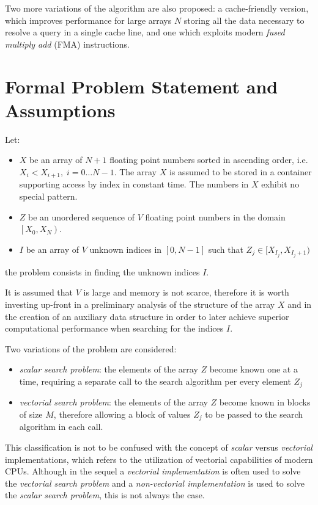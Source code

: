 \documentclass[preprint,1p,times]{elsarticle}
\begin{document}
Two more variations of the algorithm are also proposed: a cache-friendly version, which improves performance for large arrays $N$ storing all the data necessary to resolve a query in a single cache line, and one which exploits modern \textit{fused multiply add} (FMA) instructions.

\section{Formal Problem Statement and Assumptions}
\label{sec:definition}
\noindent Let: 
\begin{itemize}
	\item $X$ be an array of $N+1$ floating point numbers sorted in ascending order, i.e. $X_{i}<X_{i+1}, \; i=0 \dots N-1$.
	The array $X$ is assumed to be stored in a container supporting access by index in constant time. The numbers in $X$ exhibit no special pattern.
	\item $Z$ be an unordered sequence of $V$ floating point numbers in the domain $\left[X_0, X_N \right)$.
\item $I$ be an array of $V$ unknown indices in $[0,N-1]$ such that $Z_j \in [X_{I_j}, X_{I_j+1})$
\end{itemize}
the problem consists in finding the unknown indices $I$.

It is assumed that $V$ is large and memory is not scarce, therefore it is worth investing up-front in a preliminary analysis of the structure of the array $X$ and in the creation of an auxiliary data structure in order to later achieve superior computational performance when searching for the indices $I$.

Two variations of the problem are considered:
\begin{itemize}
\item \textit{scalar search problem}: the elements of the array $Z$ become known one at a time, requiring a separate call to the search algorithm per every element $Z_j$
\item \textit{vectorial search problem}: the elements of the array $Z$ become known in blocks of size $M$, therefore allowing a block of values $Z_j$ to be passed to the search algorithm in each call.
\end{itemize}
This classification is not to be confused with the concept of \textit{scalar} versus \textit{vectorial} implementations, which refers to the utilization of vectorial capabilities of modern CPUs. Although in the sequel a \textit{vectorial implementation} is often used to solve the \textit{vectorial search problem} and a \textit{non-vectorial implementation} is used to solve the \textit{scalar search problem}, this is not always the case.
\end{document}
